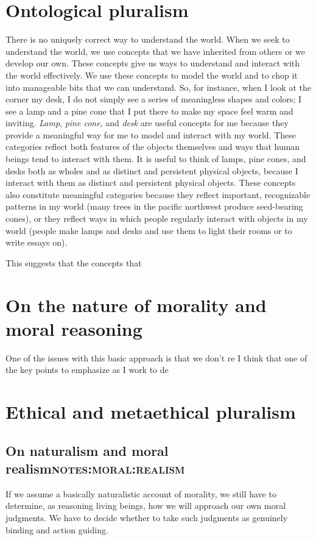 \section{Ontological pluralism}
\label{sec:ont_plural}
There is no uniquely correct way to understand the world.
When we seek to understand the world, we use concepts that we have inherited
from others or we develop our own.
These concepts give us ways to understand and interact with the world
effectively.
We use these concepts to model the world and to chop it into manageable bits
that we can understand.
So, for instance, when I look at the corner my desk, I do not simply see a
series of meaningless shapes and colors; I see a lamp and a pine cone that I
put there to make my space feel warm and inviting.
\emph{Lamp}, \emph{pine cone}, and \emph{desk} are useful concepts for me because they
provide a meaningful way for me to model and interact with my world.
These categories reflect both features of the objects themselves and ways that
human beings tend to interact with them.
It is useful to think of lamps, pine cones, and desks both as wholes and as
distinct and persistent physical objects, because I interact with them as
distinct and persistent physical objects.
These concepts also constitute meaningful categories because they reflect
important, recognizable patterns in my world (many trees in the pacific
northwest produce seed-bearing cones), or they reflect ways in which people
regularly interact with objects in my world (people make lamps and desks and
use them to light their rooms or to write essays on).

This suggests that the concepts that 
\section{On the nature of morality and moral reasoning}
\label{sec:nat_mor}
One of the issues with this basic approach is that we don't re
I think that one of the key points to emphasize as I work to de
\section{Ethical and metaethical pluralism}
\label{sec:eth_plur}
\subsection{On naturalism and moral realism\hfill{}\textsc{notes:moral:realism}}
\label{sec:org8067a0d}
If we assume a basically naturalistic account of morality, we still have to
determine, as reasoning living beings, how we will approach our own moral
judgments.
We have to decide whether to take such judgments as genuinely binding and action
guiding.
